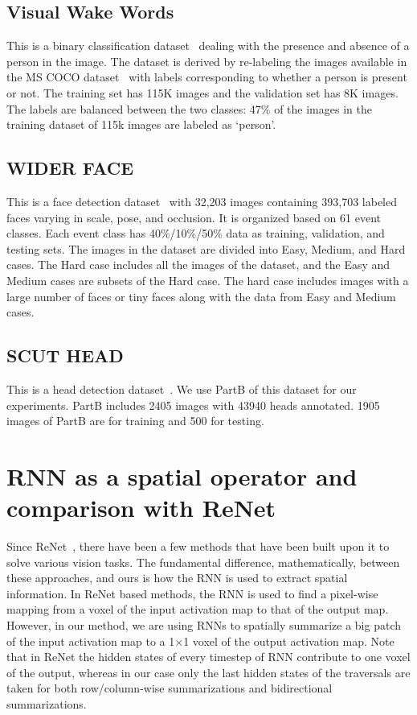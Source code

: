 \documentclass[10pt]{article}
\begin{document}
\subsection{Visual Wake Words}
This is a binary classification dataset~\citep{chowdhery2019visual}
dealing with the presence and absence of a person in the image. The
dataset is derived by re-labeling the images available in the MS COCO
dataset~\citep{lin2014microsoft} with labels corresponding to whether
a person is present or not. The training set has 115K images and the
validation set has 8K images. The labels are balanced between the two
classes: 47\% of the images in the training dataset of 115k images are
labeled as ‘person’.
 
\subsection{WIDER FACE}
This is a face detection dataset~\citep{yang2016wider} with 32,203
images containing 393,703 labeled faces varying in scale, pose, and
occlusion. It is organized based on 61 event classes. Each event class
has 40\%/10\%/50\% data as training, validation, and testing sets. The
images in the dataset are divided into Easy, Medium, and Hard
cases. The Hard case includes all the images of the dataset, and the
Easy and Medium cases are subsets of the Hard case. The hard case
includes images with a large number of faces or tiny faces along with
the data from Easy and Medium cases.


\subsection{SCUT HEAD}
This is a head detection dataset~\citep{peng2018detecting}. We use PartB
of this dataset for our experiments. PartB includes 2405 images with 43940
heads annotated. 1905 images of PartB are for training and 500 for testing. 
\section{RNN as a spatial operator and comparison with ReNet}
\label{sec:renetapp}

Since ReNet~\cite{visin2015renet}, there have been a few methods that
have been built upon it to solve various vision tasks. The fundamental
difference, mathematically, between these approaches, and ours is how
the RNN is used to extract spatial information. In ReNet based
methods, the RNN is used to find a pixel-wise mapping from a voxel of
the input activation map to that of the output map. However, in our
method, we are using RNNs to spatially summarize a big patch of the
input activation map to a 1$\times$1 voxel of the output activation
map. Note that in ReNet the hidden states of every timestep of RNN
contribute to one voxel of the output, whereas in our case only the
last hidden states of the traversals are taken for both
row/column-wise summarizations and bidirectional summarizations.
\end{document}
